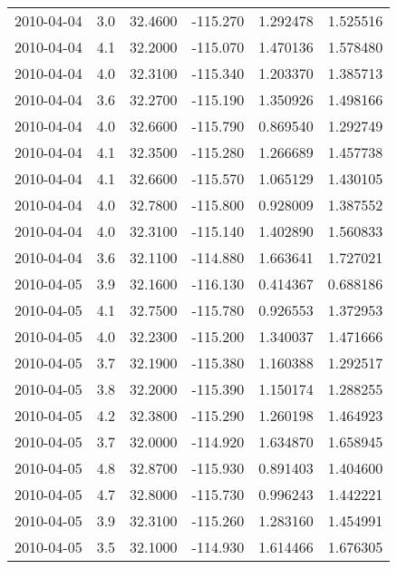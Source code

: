 \begin{tabular}{lrrrrr}
2010-04-04 &       3.0 &  32.4600 &  -115.270 &         1.292478 &         1.525516 \\
2010-04-04 &       4.1 &  32.2000 &  -115.070 &         1.470136 &         1.578480 \\
2010-04-04 &       4.0 &  32.3100 &  -115.340 &         1.203370 &         1.385713 \\
2010-04-04 &       3.6 &  32.2700 &  -115.190 &         1.350926 &         1.498166 \\
2010-04-04 &       4.0 &  32.6600 &  -115.790 &         0.869540 &         1.292749 \\
2010-04-04 &       4.1 &  32.3500 &  -115.280 &         1.266689 &         1.457738 \\
2010-04-04 &       4.1 &  32.6600 &  -115.570 &         1.065129 &         1.430105 \\
2010-04-04 &       4.0 &  32.7800 &  -115.800 &         0.928009 &         1.387552 \\
2010-04-04 &       4.0 &  32.3100 &  -115.140 &         1.402890 &         1.560833 \\
2010-04-04 &       3.6 &  32.1100 &  -114.880 &         1.663641 &         1.727021 \\
2010-04-05 &       3.9 &  32.1600 &  -116.130 &         0.414367 &         0.688186 \\
2010-04-05 &       4.1 &  32.7500 &  -115.780 &         0.926553 &         1.372953 \\
2010-04-05 &       4.0 &  32.2300 &  -115.200 &         1.340037 &         1.471666 \\
2010-04-05 &       3.7 &  32.1900 &  -115.380 &         1.160388 &         1.292517 \\
2010-04-05 &       3.8 &  32.2000 &  -115.390 &         1.150174 &         1.288255 \\
2010-04-05 &       4.2 &  32.3800 &  -115.290 &         1.260198 &         1.464923 \\
2010-04-05 &       3.7 &  32.0000 &  -114.920 &         1.634870 &         1.658945 \\
2010-04-05 &       4.8 &  32.8700 &  -115.930 &         0.891403 &         1.404600 \\
2010-04-05 &       4.7 &  32.8000 &  -115.730 &         0.996243 &         1.442221 \\
2010-04-05 &       3.9 &  32.3100 &  -115.260 &         1.283160 &         1.454991 \\
2010-04-05 &       3.5 &  32.1000 &  -114.930 &         1.614466 &         1.676305 \\

\end{tabular}
